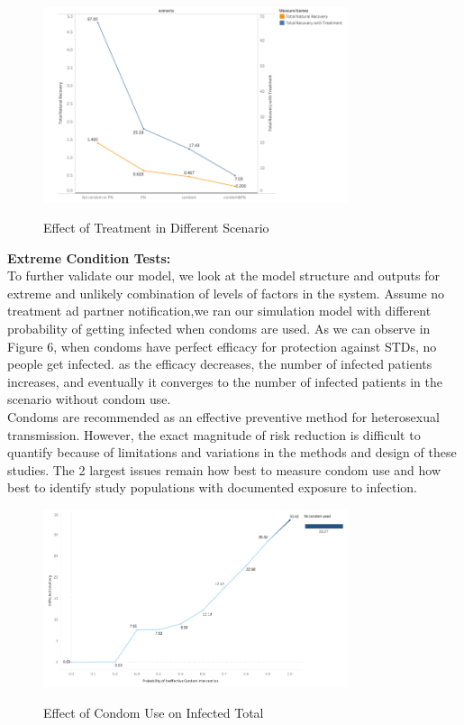 \documentclass{article}
\begin{document}
\begin{normalsize}
\begin{figure}[H]
\caption{Effect of Treatment in Different Scenario}
\includegraphics[width=0.8\textwidth]{plt4.png}
\centering
\label{fig:plt4}
\end{figure}


\textbf{Extreme Condition Tests:}\\

To further validate our model, we look at the model structure and outputs for extreme and unlikely combination of levels of factors in the system. Assume no treatment ad partner notification,we ran our simulation model with different probability of getting infected when condoms are used. As we can observe in Figure 6, when condoms have perfect efficacy for protection against STDs, no people get infected. as the efficacy decreases, the number of infected patients increases, and eventually it converges to the number of infected patients in the scenario without condom use.\\ 

Condoms are recommended as an effective preventive method for heterosexual transmission. However, the exact magnitude of risk reduction is difficult to quantify because of limitations and variations in the methods and design of these studies. The 2 largest issues remain how best to measure condom use and how best to identify study populations with documented exposure to infection. 

\begin{figure}[H]
\caption{Effect of Condom Use on Infected Total }
\includegraphics[width=0.8\textwidth]{plt5.png}
\centering
\label{fig:plt4}
\end{figure}


\end{normalsize}
\end{document}
